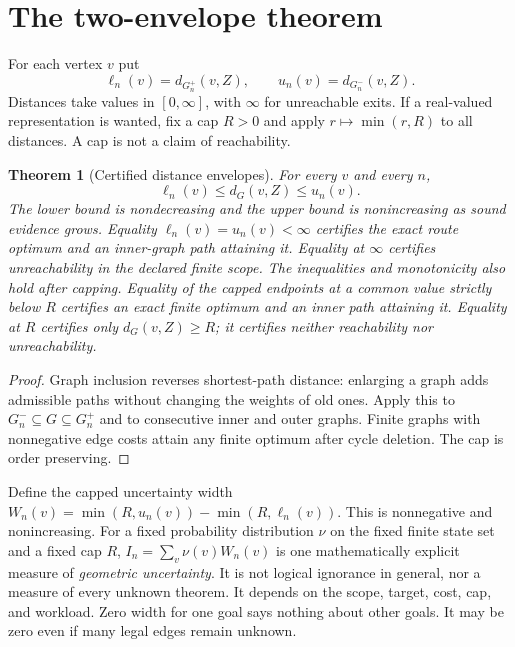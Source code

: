 \documentclass[11pt]{article}
\newtheorem{theorem}{Theorem}[section]\newtheorem{proposition}[theorem]{Proposition}\newtheorem{lemma}[theorem]{Lemma}\newtheorem{corollary}[theorem]{Corollary}
\theoremstyle{definition}\newtheorem{definition}[theorem]{Definition}\newtheorem{example}[theorem]{Example}\newtheorem{conjecture}[theorem]{Conjecture}
\begin{document}
\section{The two-envelope theorem}
For each vertex $v$ put
\[\ell_n(v)=d_{G_n^+}(v,Z),\qquad u_n(v)=d_{G_n^-}(v,Z).\]
Distances take values in $[0,\infty]$, with $\infty$ for unreachable exits. If a real-valued representation is wanted, fix a cap $R>0$ and apply $r\mapsto\min(r,R)$ to all distances. A cap is not a claim of reachability.
\begin{theorem}[Certified distance envelopes]\label{thm:env}
For every $v$ and every $n$,
\[\ell_n(v)\le d_G(v,Z)\le u_n(v).\]
The lower bound is nondecreasing and the upper bound is nonincreasing as sound evidence grows. Equality $\ell_n(v)=u_n(v)<\infty$ certifies the exact route optimum and an inner-graph path attaining it. Equality at $\infty$ certifies unreachability in the declared finite scope. The inequalities and monotonicity also hold after capping. Equality of the capped endpoints at a common value strictly below $R$ certifies an exact finite optimum and an inner path attaining it. Equality at $R$ certifies only $d_G(v,Z)\ge R$; it certifies neither reachability nor unreachability.
\end{theorem}
\begin{proof} Graph inclusion reverses shortest-path distance: enlarging a graph adds admissible paths without changing the weights of old ones. Apply this to $G_n^-\subseteq G\subseteq G_n^+$ and to consecutive inner and outer graphs. Finite graphs with nonnegative edge costs attain any finite optimum after cycle deletion. The cap is order preserving.\end{proof}
Define the capped uncertainty width $W_n(v)=\min(R,u_n(v))-\min(R,\ell_n(v))$. This is nonnegative and nonincreasing. For a fixed probability distribution $\nu$ on the fixed finite state set and a fixed cap $R$, $I_n=\sum_v\nu(v)W_n(v)$ is one mathematically explicit measure of \emph{geometric uncertainty}. It is not logical ignorance in general, nor a measure of every unknown theorem. It depends on the scope, target, cost, cap, and workload. Zero width for one goal says nothing about other goals. It may be zero even if many legal edges remain unknown.
\end{document}
